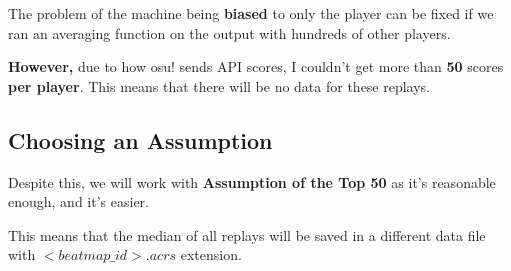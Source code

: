 The problem of the machine being \textbf{biased} to only the player can be fixed if we ran an averaging function on the output with hundreds of other players.

\textbf{However,} due to how osu! sends API scores, I couldn't get more than \textbf{50} scores \textbf{per player}. This means that there will be no data for these replays.

\subsection{Choosing an Assumption}

Despite this, we will work with \textbf{Assumption of the Top 50} as it's reasonable enough, and it's easier.

This means that the median of all replays will be saved in a different data file with $<beatmap\_id>.acrs$ extension.


